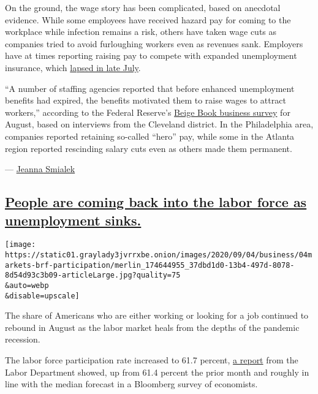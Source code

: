 On the ground, the wage story has been complicated, based on anecdotal
evidence. While some employees have received hazard pay for coming to
the workplace while infection remains a risk, others have taken wage
cuts as companies tried to avoid furloughing workers even as revenues
sank. Employers have at times reporting raising pay to compete with
expanded unemployment insurance, which
\href{https://www.nytimes3xbfgragh.onion/2020/08/27/business/since-a-600-a-week-benefit-lapsed-her-savings-have-been-dwindling.html}{lapsed
in late July}.

``A number of staffing agencies reported that before enhanced
unemployment benefits had expired, the benefits motivated them to raise
wages to attract workers,'' according to the Federal Reserve's
\href{https://www.federalreserve.gov/monetarypolicy/beigebook202009.htm}{Beige
Book business survey} for August, based on interviews from the Cleveland
district. In the Philadelphia area, companies reported retaining
so-called ``hero'' pay, while some in the Atlanta region reported
rescinding salary cuts even as others made them permanent.

--- \href{https://www.nytimes3xbfgragh.onion/by/jeanna-smialek}{Jeanna
Smialek}

\hypertarget{people-are-coming-back-into-the-labor-force-as-unemployment-sinks}{%
\subsection{\texorpdfstring{\protect\hyperlink{people-are-coming-back-into-the-labor-force-as-unemployment-sinks}{People
are coming back into the labor force as unemployment
sinks.}}{People are coming back into the labor force as unemployment sinks.}}\label{people-are-coming-back-into-the-labor-force-as-unemployment-sinks}}

\texttt{[image: https://static01.graylady3jvrrxbe.onion/images/2020/09/04/business/04markets-brf-participation/merlin\_174644955\_37dbd1d0-13b4-497d-8078-8d54d93c3b09-articleLarge.jpg?quality=75\\\&auto=webp\\\&disable=upscale]}

The share of Americans who are either working or looking for a job
continued to rebound in August as the labor market heals from the depths
of the pandemic recession.

The labor force participation rate increased to 61.7 percent,
\href{https://www.bls.gov/news.release/empsit.nr0.htm}{a report} from
the Labor Department showed, up from 61.4 percent the prior month and
roughly in line with the median forecast in a Bloomberg survey of
economists.


